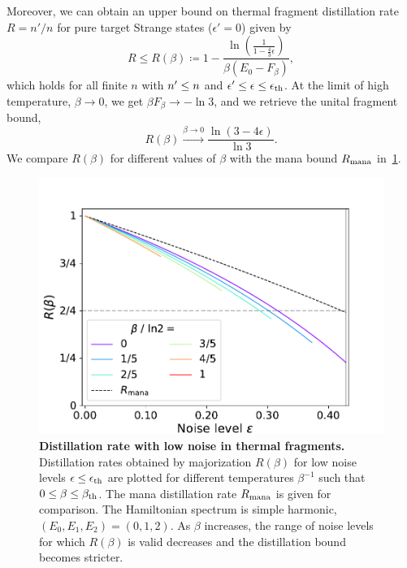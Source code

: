 \documentclass[pra,
aps,
twocolumn,
superscriptaddress,
groupedaddress,
nofootinbib,
reprint
]{revtex4-1}
\begin{document}
Moreover, we can obtain an upper bound on thermal fragment distillation rate $R=n'/n$ for pure target Strange states ($\epsilon' = 0$) given by
\begin{equation}
	R \leq R(\beta) \coloneqq 1 - \frac{\ln{\left( \frac{1}{1 - \frac{4}{3}\epsilon} \right)}}{\beta (E_0 - F_\beta)},
\end{equation}
which holds for all finite $n$ with $\tt \leq n$ and $\epsilon' \leq \epsilon \leq \epsilon_{\rm{th}}$. 
At the limit of high temperature, $\beta \rightarrow 0$, we get $\beta F_\beta \rightarrow -\ln{3}$, and we retrieve the unital fragment bound,
\begin{equation}
	R(\beta) \xrightarrow{\beta \rightarrow 0} \frac{\ln{(3-4\epsilon)}}{\ln{3}}.
\end{equation}
We compare $R(\beta)$ for different values of $\beta$ with the mana bound $R_{\rm{mana}}$ in~\cref{fig:distill_bounds_temp}.
\begin{figure}[h]
    \centering
    \includegraphics[scale=0.5]{figs/distill_bounds_temp.pdf}
    \caption{\textbf{Distillation rate with low noise in thermal fragments.} Distillation rates obtained by majorization $R(\beta)$ for low noise levels $\epsilon \leq \epsilon_{\rm{th}}$ are plotted for different temperatures $\beta^{-1}$ such that $0 \leq \beta \leq \beta_{\rm{th}}$.
    The mana distillation rate $R_{\rm{mana}}$ is given for comparison.
    The Hamiltonian spectrum is simple harmonic, $(E_0, E_1, E_2) = (0,1,2)$.
    As $\beta$ increases, the range of noise levels for which $R(\beta)$ is valid decreases and the distillation bound becomes stricter.
    }
    \label{fig:distill_bounds_temp}
\end{figure}
\end{document}
